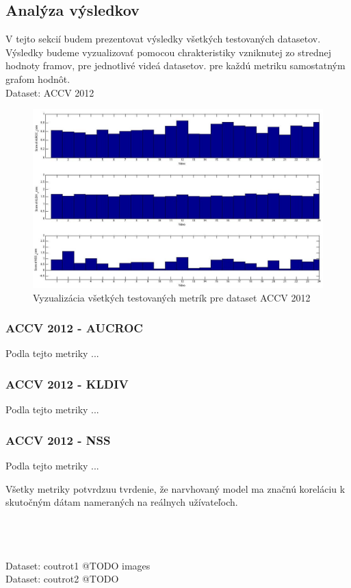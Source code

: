 \clearpage

\subsection{Analýza výsledkov}
V tejto sekcií budem prezentovat výsledky všetkých testovaných datasetov.
Výsledky budeme vyzualizovať pomocou chrakteristiky vzniknutej zo strednej hodnoty framov, pre jednotlivé videá datasetov. pre každú metriku samostatným grafom hodnôt.
\\
\vspace{10mm}
Dataset: ACCV 2012\cite{accv}
\begin{figure}[H]
  \includegraphics[width=15cm]{pics/single-accv.jpg}
  \caption{Vyzualizácia všetkých testovaných metrík pre dataset ACCV 2012\cite{accv}}
\end{figure}

\subsubsection{ACCV 2012 - AUCROC}
Podla tejto metriky ...
\subsubsection{ACCV 2012 - KLDIV}
Podla tejto metriky ...
\subsubsection{ACCV 2012 - NSS}
Podla tejto metriky ...

Všetky metriky potvrdzuu tvrdenie, že narvhovaný model ma značnú koreláciu k skutočným dátam nameraných na reálnych užívateľoch.

\\
\\
\\
Dataset: coutrot1\cite{accv}
@TODO images\\
Dataset: coutrot2\cite{accv}
@TODO \\

